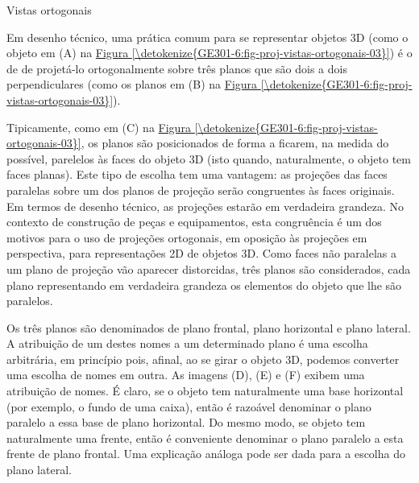 \label{\detokenize{GE301-6:ativ-proj-vistas-ortogonais}}
\begin{task}{Vistas ortogonais}

Em desenho técnico, uma prática comum para se representar objetos 3D (como o objeto em (A) na \hyperref[\detokenize{GE301-6:fig-proj-vistas-ortogonais-03}]{Figura \ref{\detokenize{GE301-6:fig-proj-vistas-ortogonais-03}}}) é o de de projetá-lo ortogonalmente sobre três planos que são dois a dois perpendiculares (como os planos em (B) na \hyperref[\detokenize{GE301-6:fig-proj-vistas-ortogonais-03}]{Figura \ref{\detokenize{GE301-6:fig-proj-vistas-ortogonais-03}}}).

Tipicamente, como em (C) na \hyperref[\detokenize{GE301-6:fig-proj-vistas-ortogonais-03}]{Figura \ref{\detokenize{GE301-6:fig-proj-vistas-ortogonais-03}}}, os planos são posicionados de forma a ficarem, na medida do possível, parelelos às faces do objeto 3D (isto quando, naturalmente, o objeto tem faces planas). Este tipo de escolha tem uma vantagem: as projeções das faces paralelas sobre um dos planos de projeção serão congruentes às faces originais. Em termos de desenho técnico, as projeções estarão em verdadeira grandeza. No contexto de construção de peças e equipamentos, esta congruência é um dos motivos para o uso de projeções ortogonais, em oposição às projeções em perspectiva, para representações 2D de objetos 3D. Como faces não paralelas a um plano de projeção vão aparecer distorcidas, três planos são considerados, cada plano representando em verdadeira grandeza os elementos do objeto que lhe são paralelos.

Os três planos são denominados de plano frontal, plano horizontal e plano lateral. A atribuição de um destes nomes a um determinado plano é uma escolha arbitrária, em princípio pois, afinal, ao se girar o objeto 3D, podemos converter uma escolha de nomes em outra. As imagens (D), (E) e (F) exibem uma atribuição de nomes. É claro, se o objeto tem naturalmente uma base horizontal (por exemplo, o fundo de uma caixa), então é razoável denominar o plano paralelo a essa base de plano horizontal. Do mesmo modo, se objeto tem naturalmente uma frente, então é conveniente denominar o plano paralelo a esta frente de plano frontal. Uma explicação análoga pode ser dada para a escolha do plano lateral.


\begin{minipage}{\linewidth}
\begin{figure}[H]
\centering
\begin{multicols}{3}


\end{multicols}
\end{figure}
\end{minipage}
\end{task}
